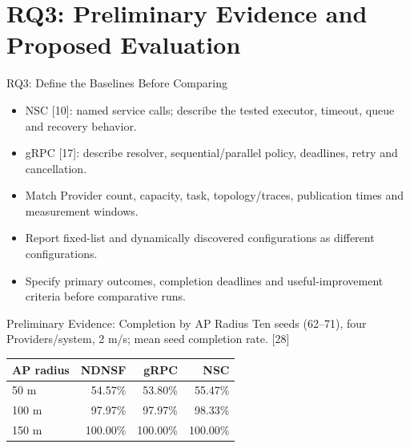 \section{RQ3: Preliminary Evidence and Proposed Evaluation}
\begin{frame}{RQ3: Define the Baselines Before Comparing}
\begin{itemize}
\item NSC [10]: named service calls; describe the tested executor, timeout, queue and recovery behavior.
\item gRPC [17]: describe resolver, sequential/parallel policy, deadlines, retry and cancellation.
\item Match Provider count, capacity, task, topology/traces, publication times and measurement windows.
\item Report fixed-list and dynamically discovered configurations as different configurations.
\item Specify primary outcomes, completion deadlines and useful-improvement criteria before comparative runs.
\end{itemize}
\end{frame}

\begin{frame}{Preliminary Evidence: Completion by AP Radius}
\small Ten seeds (62--71), four Providers/system, 2 m/s; mean seed completion rate. [28]
\par\vspace{4mm}
\begin{tabularx}{\linewidth}{Xrrr}
\toprule AP radius & NDNSF & gRPC & NSC\\\midrule
50 m & 54.57\% & 53.80\% & 55.47\%\\\midrule
100 m & 97.97\% & 97.97\% & 98.33\%\\\midrule
150 m & 100.00\% & 100.00\% & 100.00\%\\\bottomrule
\end{tabularx}
\vspace{4mm}
\end{frame}

